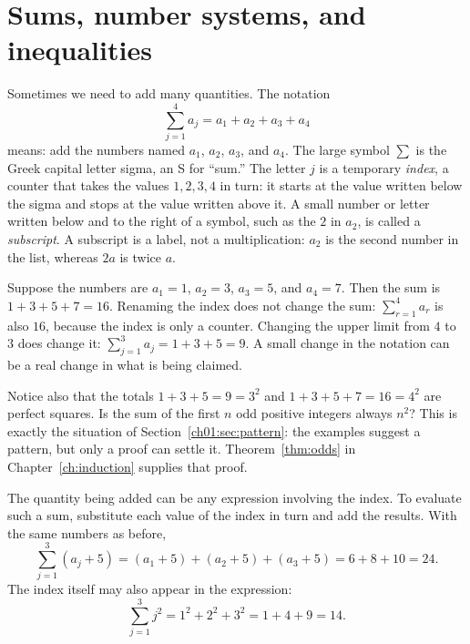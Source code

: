 \section{Sums, number systems, and inequalities}\label{ch01:sec:notation}
Sometimes we need to add many quantities. The notation
\[
\sum_{j=1}^{4}a_j=a_1+a_2+a_3+a_4
\]
means: add the numbers named $a_1$, $a_2$, $a_3$, and $a_4$. The large symbol $\sum$ is the Greek capital letter sigma, an S for ``sum.'' The letter $j$ is a temporary \emph{index}, a counter that takes the values $1,2,3,4$ in turn: it starts at the value written below the sigma and stops at the value written above it. A small number or letter written below and to the right of a symbol, such as the $2$ in $a_2$, is called a \emph{subscript}. A subscript is a label, not a multiplication: $a_2$ is the second number in the list, whereas $2a$ is twice $a$.

Suppose the numbers are $a_1=1$, $a_2=3$, $a_3=5$, and $a_4=7$. Then the sum is $1+3+5+7=16$. Renaming the index does not change the sum: $\sum_{r=1}^{4}a_r$ is also $16$, because the index is only a counter. Changing the upper limit from $4$ to $3$ does change it: $\sum_{j=1}^{3}a_j=1+3+5=9$. A small change in the notation can be a real change in what is being claimed.

Notice also that the totals $1+3+5=9=3^2$ and $1+3+5+7=16=4^2$ are perfect squares. Is the sum of the first $n$ odd positive integers always $n^2$? This is exactly the situation of Section~\ref{ch01:sec:pattern}: the examples suggest a pattern, but only a proof can settle it. Theorem~\ref{thm:odds} in Chapter~\ref{ch:induction} supplies that proof.

The quantity being added can be any expression involving the index. To evaluate such a sum, substitute each value of the index in turn and add the results. With the same numbers as before,
\[
\sum_{j=1}^{3}(a_j+5)=(a_1+5)+(a_2+5)+(a_3+5)=6+8+10=24.
\]
The index itself may also appear in the expression:
\[
\sum_{j=1}^{3}j^2=1^2+2^2+3^2=1+4+9=14.
\]

